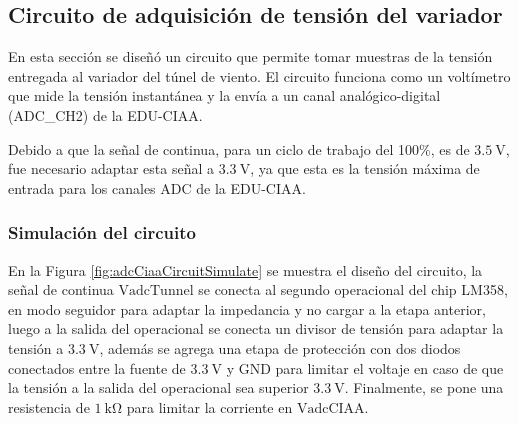 \subsection{Circuito de adquisición de tensión del variador}\label{sec:adquisicionVadcTunel}

En esta sección se diseñó un circuito que permite tomar muestras de la tensión entregada al variador del túnel de viento. El circuito funciona como un voltímetro que mide la tensión instantánea y la envía a un canal analógico-digital (ADC\_CH2) de la EDU-CIAA. 

Debido a que la señal de continua, para un ciclo de trabajo del 100\%, es de $\SI{3.5}{\volt}$, fue necesario adaptar esta señal a $\SI{3.3}{\volt}$, ya que esta es la tensión máxima de entrada para los canales ADC de la EDU-CIAA.

\subsubsection{Simulación del circuito}

En la Figura \ref{fig:adcCiaaCircuitSimulate} se muestra el diseño del circuito, la señal de continua $\text{VadcTunnel}$ se conecta al segundo operacional del chip LM358, en modo seguidor para adaptar la impedancia y no cargar a la etapa anterior, luego a la salida del operacional se conecta un divisor de tensión para adaptar la tensión a $\SI{3.3}{\volt}$, además se agrega una etapa de protección con dos diodos conectados entre la fuente de $\SI{3.3}{\volt}$ y GND para limitar el voltaje en caso de que la tensión a la salida del operacional sea superior  $\SI{3.3}{\volt}$. Finalmente, se pone una resistencia de $\SI{1}{\kilo\ohm}$ para limitar la corriente en  $\text{VadcCIAA}$.


